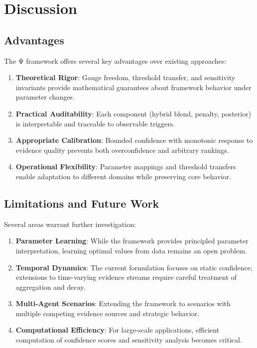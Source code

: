 \documentclass[12pt,a4paper]{article}
\begin{document}
\section{Discussion}

\subsection{Advantages}

The Ψ framework offers several key advantages over existing approaches:

\begin{enumerate}
\item \textbf{Theoretical Rigor}: Gauge freedom, threshold transfer, and sensitivity invariants provide mathematical guarantees about framework behavior under parameter changes.

\item \textbf{Practical Auditability}: Each component (hybrid blend, penalty, posterior) is interpretable and traceable to observable triggers.

\item \textbf{Appropriate Calibration}: Bounded confidence with monotonic response to evidence quality prevents both overconfidence and arbitrary rankings.

\item \textbf{Operational Flexibility}: Parameter mappings and threshold transfers enable adaptation to different domains while preserving core behavior.
\end{enumerate}

\subsection{Limitations and Future Work}

Several areas warrant further investigation:

\begin{enumerate}
\item \textbf{Parameter Learning}: While the framework provides principled parameter interpretation, learning optimal values from data remains an open problem.

\item \textbf{Temporal Dynamics}: The current formulation focuses on static confidence; extensions to time-varying evidence streams require careful treatment of aggregation and decay.

\item \textbf{Multi-Agent Scenarios}: Extending the framework to scenarios with multiple competing evidence sources and strategic behavior.

\item \textbf{Computational Efficiency}: For large-scale applications, efficient computation of confidence scores and sensitivity analysis becomes critical.
\end{enumerate}
\end{document}

